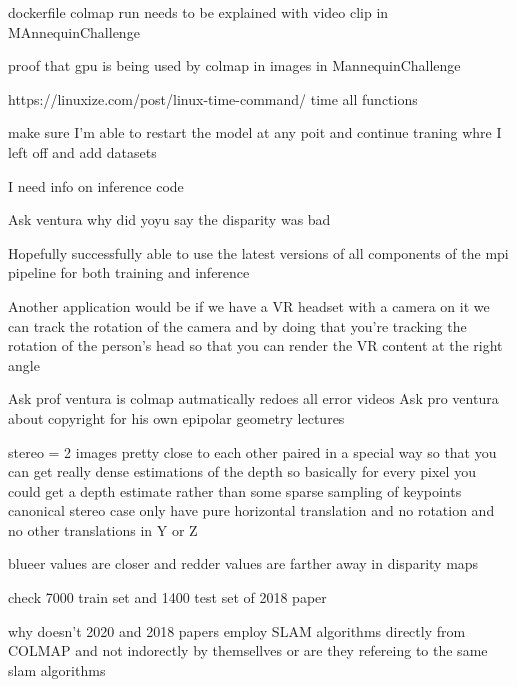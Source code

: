 dockerfile colmap run needs to be explained with video clip in MAnnequinChallenge

proof that gpu is being used by colmap in images in MannequinChallenge


https://linuxize.com/post/linux-time-command/
time all functions

make sure I'm able to restart the model at any poit and continue traning whre I left off and add datasets 

I need info on inference code 

Ask ventura why did yoyu say the disparity was bad

Hopefully successfully able to use the latest versions of all components of the mpi pipeline for both training and inference  

Another application would be if we have a VR headset with a camera on it we can track the rotation of the camera and by doing that you're tracking the rotation of the person's head so that you can render the VR content at the right angle

Ask prof ventura is colmap autmatically redoes all error videos 
Ask pro ventura about copyright for his own epipolar geometry lectures

stereo = 2 images pretty close to each other paired in a special way so that you can get really dense estimations of the depth so basically for every pixel you could get a depth estimate rather than some sparse sampling of keypoints
canonical stereo case only have pure horizontal translation and no rotation and no other translations in Y or Z  

blueer values are closer and redder values are farther away in disparity maps

check 7000 train set and 1400 test set of 2018 paper

why doesn't 2020 and 2018 papers employ SLAM algorithms directly from COLMAP and not indorectly by themsellves or are they refereing to the same slam algorithms
